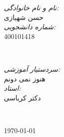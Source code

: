 \begin{titlepage}
    
    \begin{minipage}{0.4\textwidth}
    \begin{flushright} \large
    \emph{نام و نام خانوادگی: }\\
    حسن شهبازی %
    \\[1.2em]
    \emph{شماره دانشجویی: }\\
    400101418 \\[1.2em]
    \end{flushright}
    \end{minipage}
    ~
    \begin{minipage}{0.4\textwidth}
    \begin{flushleft} \large
    \emph{سردستیار آموزشی: } \\
    هنوز نمی دونم  \\[1.2em] %
    \emph{استاد: } \\
    دکتر کرباسی %
    \end{flushleft}
    \end{minipage}\\[2cm]
    \makeatother
    
    
    
    {\large \today}\\[2cm] %
    
    \vfill %
    
    \end{titlepage}